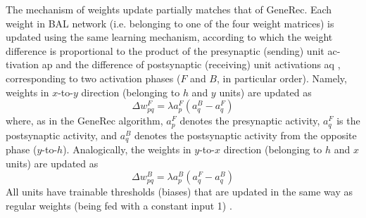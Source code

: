 The mechanism of weights update partially matches that of GeneRec. Each
weight in BAL network (i.e. belonging to one of the four weight matrices) is
updated using the same learning mechanism, according to which the weight
difference is proportional to the product of the presynaptic (sending) unit ac-
tivation ap and the difference of postsynaptic (receiving) unit activations aq ,
corresponding to two activation phases ($F$ and $B$, in particular order). Namely,
weights in $x$-to-$y$ direction (belonging to $h$ and $y$ units) are updated as
$$
\Delta w_{pq}^F = \lambda a_p^F(a_q^B - a_q^F)
$$
where, as in the GeneRec algorithm, $a^F_p$ denotes the presynaptic activity, $a^F_q$ is the postsynaptic activity, and $a^B_q$ denotes the postsynaptic activity from the opposite phase ($y$-to-$h$). Analogically, the weights in $y$-to-$x$ direction (belonging to $h$ and $x$ units) are updated as 
$$
\Delta w_{pq}^B = \lambda a^B_p(a_q^F - a_q^B)
$$
All units have trainable thresholds (biases) that are updated in the same way
as regular weights (being fed with a constant input 1) \citet{farkas2013bal}.
 


